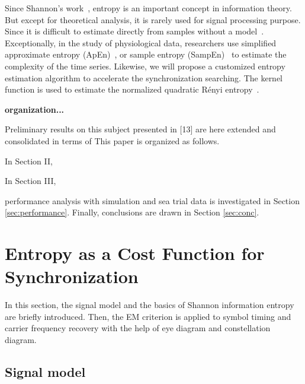\documentclass[journal,comsoc]{IEEEtran}
\begin{document}
Since Shannon's work~\cite{Shannon1948}, entropy is an important concept in information theory. 
But except for theoretical analysis, it is rarely used for signal processing purpose.
Since it is difficult to estimate directly from samples without a model~\cite{Bercher2000,Santamaria2002}.
Exceptionally, in the study of physiological data, researchers use simplified approximate entropy (ApEn)~\cite{Pincus1991}, or sample entropy (SampEn)~\cite{Richman2000} to estimate the complexity of the time series.
Likewise, we will propose a customized entropy estimation algorithm to accelerate the synchronization searching. 
The kernel function is used to estimate the normalized quadratic R\'enyi entropy~\cite{Santamaria2002,Huang2008}.


\textbf{organization...}

Preliminary results on this subject presented in [13] are here extended and consolidated in terms of
This paper is organized as follows.

In Section II,

In Section III,

performance analysis with simulation and sea trial data is investigated in Section \ref{sec:performance}. 
Finally, conclusions are drawn in Section \ref{sec:conc}.

\section{Entropy as a Cost Function for Synchronization}
\label{sec:entropy}
In this section, the signal model and the basics of Shannon information entropy are briefly introduced.
Then, the EM criterion is applied to symbol timing and carrier frequency recovery with the help of eye diagram and constellation diagram.
\subsection{Signal model }  
\end{document}
